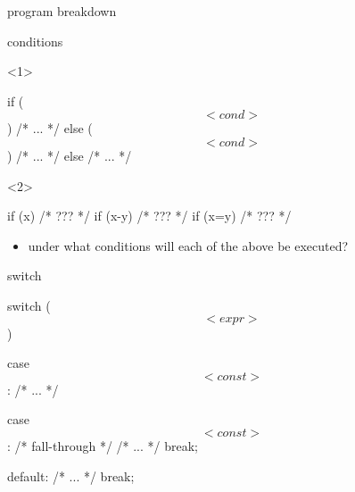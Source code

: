 \documentclass[10pt,t,svgnames]{beamer}
\begin{document}
\begin{frame}[fragile]{program breakdown}
  \end{frame}

  \begin{frame}[fragile]{conditions}
    \begin{onlyenv}<1>
      \begin{codeblock}
    if ($$<cond>$$) {
      /* ... */
    }
    else ($$<cond>$$) {
      /* ... */
    }
    else {
      /* ... */
    }
      \end{codeblock}
    \end{onlyenv}
    \begin{onlyenv}<2>
      \begin{codeblock}
    if (x) {
      /* ??? */
    }
    if (x-y) {
      /* ??? */
    }
    if (x=y) {
      /* ??? */
    }
      \end{codeblock}
      \begin{itemize}
        \item under what conditions will each of the above be executed?
      \end{itemize}
    \end{onlyenv}

  \end{frame}

  \begin{frame}[fragile]{switch}
    \begin{codeblock}
    switch ($$<expr>$$) {
      case $$<const>$$:
      /* ... */

      case $$<const>$$: /* fall-through */
      /* ... */
      break;

      default:
      /* ... */
      break;
    }
    \end{codeblock}

  \end{frame}
\end{document}

